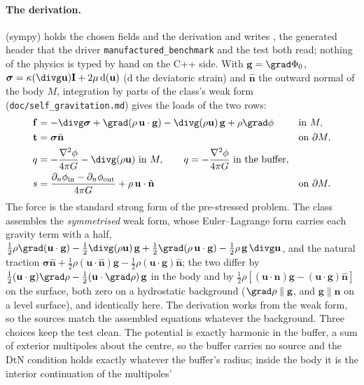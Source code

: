 \documentclass[11pt]{article}
\numberwithin{equation}{section}
\newcommand{\vu}{\mathbf{u}}
\newcommand{\vt}{\mathbf{t}}
\newcommand{\vn}{\hat{\mathbf{n}}}
\newcommand{\code}[1]{\texttt{#1}}
\newcommand{\bsig}{\bm{\sigma}}
\begin{document}
\paragraph{The derivation.}  (sympy) holds the chosen
fields and the derivation and writes , the generated header
that the driver \code{manufactured\_benchmark} and the test both read;
nothing of the physics is typed by hand on the C++ side. With
$\mathbf{g}=\grad\Phi_0$, $\bsig = \kappa(\divg\vu)\mathbf{I} + 2\mu\,
\mathrm{d}(\vu)$ ($\mathrm{d}$ the deviatoric strain) and $\vn$ the outward
normal of the body $M$, integration by parts of the class's weak form
(\code{doc/self\_gravitation.md}) gives the loads of the two rows:
\begin{align*}
  \mathbf{f} &= -\divg\bsig + \grad(\rho\,\vu\cdot\mathbf{g})
    - \divg(\rho\vu)\,\mathbf{g} + \rho\grad\phi
    && \text{in } M,\\
  \vt &= \bsig\vn && \text{on } \partial M,\\
  q &= -\frac{\nabla^2\phi}{4\pi G} - \divg(\rho\vu) \ \text{in } M,
  \qquad q = -\frac{\nabla^2\phi}{4\pi G} \ \text{in the buffer},\\
  s &= \frac{\partial_n\phi_{\mathrm{in}} - \partial_n\phi_{\mathrm{out}}}{4\pi G}
    + \rho\,\vu\cdot\vn && \text{on } \partial M.
\end{align*}
The force is the standard strong form of the pre-stressed problem. The
class assembles the \emph{symmetrised} weak form, whose Euler--Lagrange
form carries each gravity term with a half,
$\tfrac12\rho\grad(\vu\cdot\mathbf{g}) - \tfrac12\divg(\rho\vu)\,\mathbf{g}
+ \tfrac12\grad(\rho\,\vu\cdot\mathbf{g}) - \tfrac12\rho\,\mathbf{g}\,\divg\vu$,
and the natural traction $\bsig\vn + \tfrac12\rho(\vu\cdot\vn)\mathbf{g}
- \tfrac12\rho(\vu\cdot\mathbf{g})\vn$; the two differ by
$\tfrac12(\vu\cdot\mathbf{g})\grad\rho - \tfrac12(\vu\cdot\grad\rho)\,\mathbf{g}$
in the body and by $\tfrac12\rho[(\vu\cdot\vn)\mathbf{g} -
(\vu\cdot\mathbf{g})\vn]$ on the surface, both zero on a hydrostatic
background ($\grad\rho \parallel \mathbf{g}$, and $\mathbf{g} \parallel
\vn$ on a level surface), and identically here. The derivation works from
the weak form, so the sources match the assembled equations whatever the
background. Three choices keep the test clean. The potential is exactly harmonic in the
buffer, a sum of exterior multipoles about the centre, so the buffer
carries no source and the DtN condition holds exactly whatever the buffer's
radius; inside the body it is the interior continuation of the multipoles'
\end{document}
